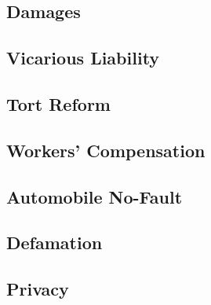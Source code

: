 \subsection{Damages}
\subsection{Vicarious Liability}
\subsection{Tort Reform}
\subsection{Workers' Compensation}
\subsection{Automobile No-Fault}
\subsection{Defamation}
\subsection{Privacy}
